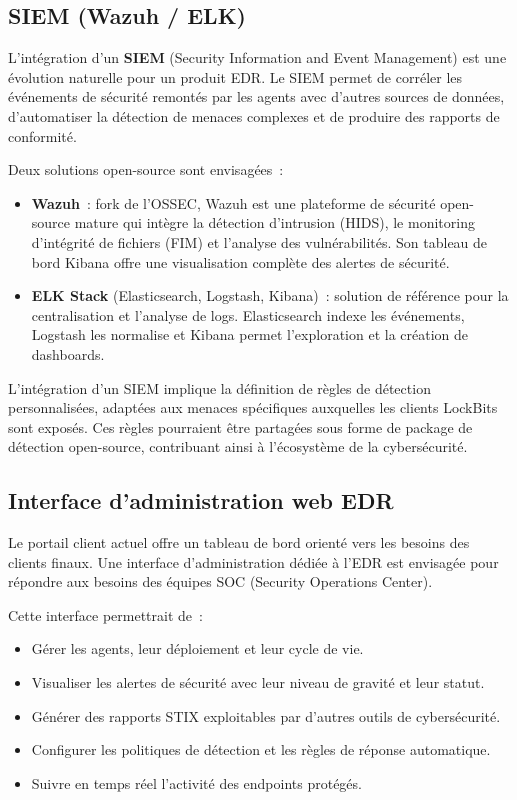 \subsection{SIEM (Wazuh / ELK)}

L'intégration d'un \textbf{SIEM} (Security Information and Event
Management) est une évolution naturelle pour un produit EDR. Le SIEM
permet de corréler les événements de sécurité remontés par les agents
avec d'autres sources de données, d'automatiser la détection de
menaces complexes et de produire des rapports de conformité.

Deux solutions open-source sont envisagées~:

\begin{itemize}
  \item \textbf{Wazuh}~: fork de l'OSSEC, Wazuh est une plateforme de
    sécurité open-source mature qui intègre la détection d'intrusion
    (HIDS), le monitoring d'intégrité de fichiers (FIM) et l'analyse
    des vulnérabilités. Son tableau de bord Kibana offre une
    visualisation complète des alertes de sécurité.
  \item \textbf{ELK Stack} (Elasticsearch, Logstash, Kibana)~: solution
    de référence pour la centralisation et l'analyse de logs.
    Elasticsearch indexe les événements, Logstash les normalise et
    Kibana permet l'exploration et la création de dashboards.
\end{itemize}

L'intégration d'un SIEM implique la définition de règles de détection
personnalisées, adaptées aux menaces spécifiques auxquelles les clients
LockBits sont exposés. Ces règles pourraient être partagées sous forme
de package de détection open-source, contribuant ainsi à l'écosystème
de la cybersécurité.

\subsection{Interface d'administration web EDR}

Le portail client actuel offre un tableau de bord orienté vers les
besoins des clients finaux. Une interface d'administration dédiée à
l'EDR est envisagée pour répondre aux besoins des équipes SOC (Security
Operations Center).

Cette interface permettrait de~:

\begin{itemize}
  \item Gérer les agents, leur déploiement et leur cycle de vie.
  \item Visualiser les alertes de sécurité avec leur niveau de gravité
    et leur statut.
  \item Générer des rapports STIX exploitables par d'autres outils de
    cybersécurité.
  \item Configurer les politiques de détection et les règles de
    réponse automatique.
  \item Suivre en temps réel l'activité des endpoints protégés.
\end{itemize}

